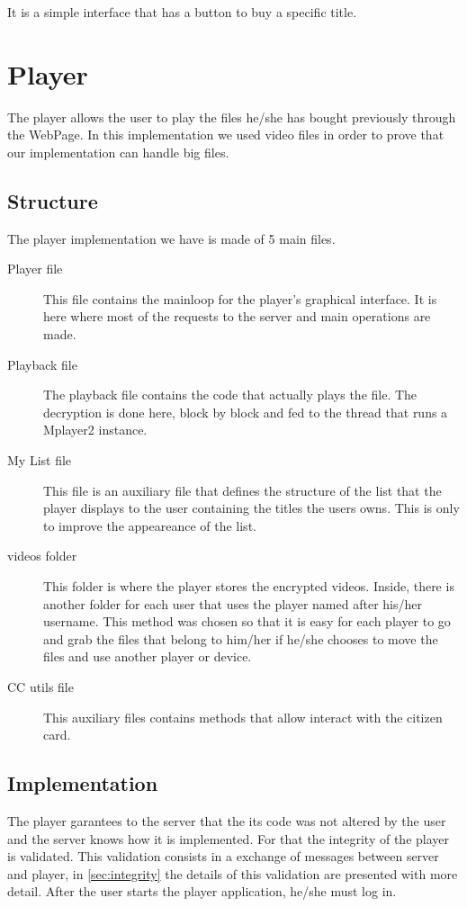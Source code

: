 \documentclass[11pt,a4paper]{report}
\begin{document}
It is a simple interface that has a button to buy a specific title.

\section{Player}
The player allows the user to play the files he/she has bought previously through the WebPage. 
\newline  In this implementation we used video files in order to prove that our implementation can handle big files.

\subsection{Structure}
The player implementation we have is made of 5 main files. 

\begin{description}
  \item[Player file] This file contains the mainloop for the player's graphical interface. It is here where most of the requests to the server and main operations are made.
  \item[Playback file] The playback file contains the code that actually plays the file. The decryption is done here, block by block and fed to the thread that runs a Mplayer2 instance.
  \item[My List file] This file is an auxiliary file that defines the structure of the list that the player displays to the user containing the titles the users owns. This is only to improve the appeareance of the list.
  \item[videos folder] This folder is where the player stores the encrypted videos. Inside, there is another folder for each user that uses the player named after his/her username. This method was chosen so that it is easy for each player to go and grab the files that belong to him/her if he/she chooses to move the files and use another player or device.
  \item[CC utils file] This auxiliary files contains methods that allow interact with the citizen card.
\end{description}

\subsection{Implementation}

The player garantees to the server that the its code was not altered by the user and the server knows how it is implemented. For that the integrity of the player is validated. This validation consists in a exchange of messages between server and player, in \autoref{sec:integrity} the details of this validation are presented with more detail.
After the user starts the player application, he/she must log in. 
\end{document}
